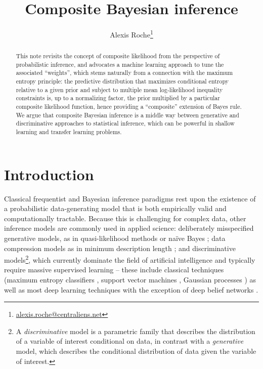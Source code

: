 \documentclass[english]{scrartcl}
\title{Composite Bayesian inference}
\date{}
\author{Alexis Roche\thanks{\url{alexis.roche@centraliens.net}}}
\begin{document}
\maketitle

\begin{abstract}
This note revisits the concept of composite likelihood from the perspective of probabilistic inference, and advocates a machine learning approach to tune the associated ``weights'', which stems naturally from a connection with the maximum entropy principle: the predictive distribution that maximizes conditional entropy relative to a given prior and subject to multiple mean log-likelihood inequality constraints is, up to a normalizing factor, the prior multiplied by a particular composite likelihood function, hence providing a ``composite'' extension of Bayes rule. We argue that composite Bayesian inference is a middle way between generative and discriminative approaches to statistical inference, which can be powerful in shallow learning and transfer learning problems.
\end{abstract}


\section{Introduction}
\label{sec:intro}

Classical frequentist and Bayesian inference paradigms rest upon the existence of a probabilistic data-generating model that is both empirically valid and computationally tractable. Because this is challenging for complex data, other inference models are commonly used in applied science: deliberately misspecified generative models, as in quasi-likelihood methods \cite{White-82,Walker-13} or na\"ive Bayes \cite{Ng-01}; data compression models as in minimum description length \cite{Grunwald-07}; and discriminative models\footnote{A {\em discriminative} model is a parametric family that describes the distribution of a variable of interest conditional on data, in contrast with a {\em generative} model, which describes the conditional distribution of data given the variable of interest.}, which currently dominate the field of artificial intelligence and typically require massive supervised learning -- these include classical techniques (maximum entropy classifiers \cite{BergerA-96}, support vector machines \cite{Vapnik-00}, Gaussian processes \cite{Rasmussen-06}) as well as most deep learning techniques \cite{Lecun-15,Goodfellow-16} with the exception of deep belief networks \cite{Hinton-06,Fischer-14}. 
\end{document}
